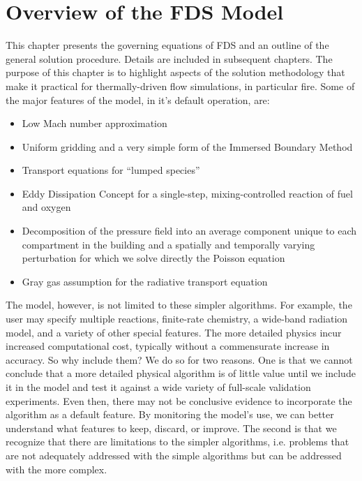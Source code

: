 \chapter{Overview of the FDS Model}

\label{basisformodel}

This chapter presents the governing equations of FDS and an outline of the general solution procedure. Details are included
in subsequent chapters. The purpose of this chapter is to highlight aspects of the solution methodology that make it
practical for thermally-driven flow simulations, in particular fire. Some of the major features of the model, in it's default operation,
are:
\begin{itemize}
\item Low Mach number approximation
\item Uniform gridding and a very simple form of the Immersed Boundary Method
\item Transport equations for ``lumped species''
\item Eddy Dissipation Concept for a single-step, mixing-controlled reaction of fuel and oxygen
\item Decomposition of the pressure field into an average component unique to each compartment in the building and
a spatially and temporally varying perturbation for which we solve directly the Poisson equation
\item Gray gas assumption for the radiative transport equation
\end{itemize}

The model, however, is not limited to
these simpler algorithms. For example, the user may specify multiple reactions, finite-rate chemistry, a wide-band radiation model, and a variety
of other special features. The more detailed physics incur increased computational cost, typically without a commensurate increase in
accuracy. So why include them? We do so for two reasons.  One is that we cannot conclude that a more detailed physical algorithm is of little value until we
include it in the model and test it against a wide variety of full-scale validation experiments. Even then, there may not be
conclusive evidence to incorporate the algorithm as a default feature. By monitoring the model's use, we can better understand what
features to keep, discard, or improve.  The second is that we recognize that there are limitations to the simpler algorithms, i.e. problems that are not adequately addressed with the simple algorithms but can be addressed with the more complex.

